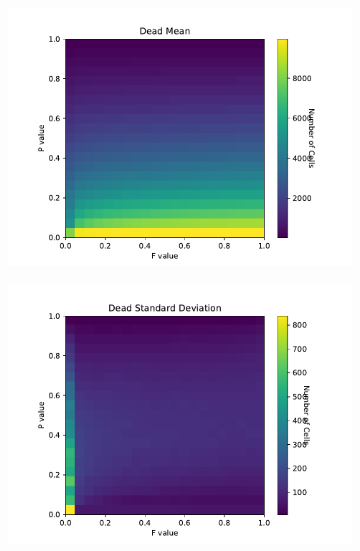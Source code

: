 \documentclass{article}
\begin{document}
\begin{figure}[H]
\centering
\begin{subfigure}{.5\textwidth}
    \centering
    \includegraphics[scale=0.4]{Dead Mean.pdf}
    \label{fig:deadmean}
\end{subfigure}%
\begin{subfigure}{.5\textwidth}
    \centering
    \includegraphics[scale=0.4]{Dead STD.pdf}
    \label{fig:deadstd}
\end{subfigure}
\label{fig:dead}
\end{figure}
\end{document}
